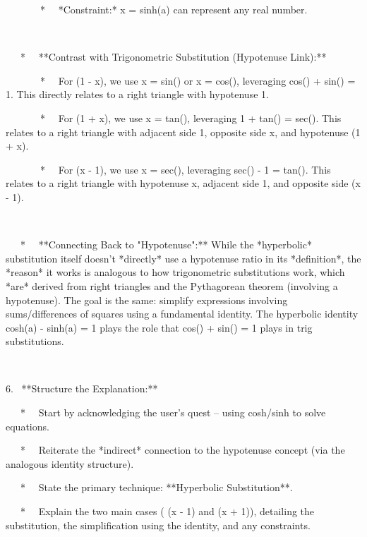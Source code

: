 \documentclass{article}
\newcommand{\nonconverted}[1]{\mbox{}}
\begin{document}
\ \ \ \ \ \ \ * \ \ *Constraint:* x = sinh(a) can represent any real number.

\

\ \ \ * \ \ **Contrast with Trigonometric Substitution (Hypotenuse Link):**

\ \ \ \ \ \ \ * \ \ For  \nonconverted{sqrt} (1 - x{\texttwosuperior}), we
use x = sin({\theta}) or x = cos({\theta}), leveraging
cos{\texttwosuperior}({\theta}) + sin{\texttwosuperior}({\theta}) = 1. This
directly relates to a right triangle with hypotenuse 1.

\ \ \ \ \ \ \ * \ \ For  \nonconverted{sqrt} (1 + x{\texttwosuperior}), we
use x = tan({\theta}), leveraging 1 + tan{\texttwosuperior}({\theta}) =
sec{\texttwosuperior}({\theta}). This relates to a right triangle with
adjacent side 1, opposite side x, and hypotenuse  \nonconverted{sqrt} (1 +
x{\texttwosuperior}).

\ \ \ \ \ \ \ * \ \ For  \nonconverted{sqrt} (x{\texttwosuperior} - 1), we
use x = sec({\theta}), leveraging sec{\texttwosuperior}({\theta}) - 1 =
tan{\texttwosuperior}({\theta}). This relates to a right triangle with
hypotenuse x, adjacent side 1, and opposite side  \nonconverted{sqrt}
(x{\texttwosuperior} - 1).

\

\ \ \ * \ \ **Connecting Back to "Hypotenuse":** While the *hyperbolic*
substitution itself doesn't *directly* use a hypotenuse ratio in its
*definition*, the *reason* it works is analogous to how trigonometric
substitutions work, which *are* derived from right triangles and the
Pythagorean theorem (involving a hypotenuse). The goal is the same: simplify
expressions involving sums/differences of squares using a fundamental
identity. The hyperbolic identity cosh{\texttwosuperior}(a) -
sinh{\texttwosuperior}(a) = 1 plays the role that
cos{\texttwosuperior}({\theta}) + sin{\texttwosuperior}({\theta}) = 1 plays in
trig substitutions.

\

6. \ **Structure the Explanation:**

\ \ \ * \ \ Start by acknowledging the user's quest -- using cosh/sinh to
solve equations.

\ \ \ * \ \ Reiterate the *indirect* connection to the hypotenuse concept
(via the analogous identity structure).

\ \ \ * \ \ State the primary technique: **Hyperbolic Substitution**.

\ \ \ * \ \ Explain the two main cases (\nonconverted{sqrt}
(x{\texttwosuperior} - 1) and  \nonconverted{sqrt} (x{\texttwosuperior} + 1)),
detailing the substitution, the simplification using the identity, and any
constraints.
\end{document}
